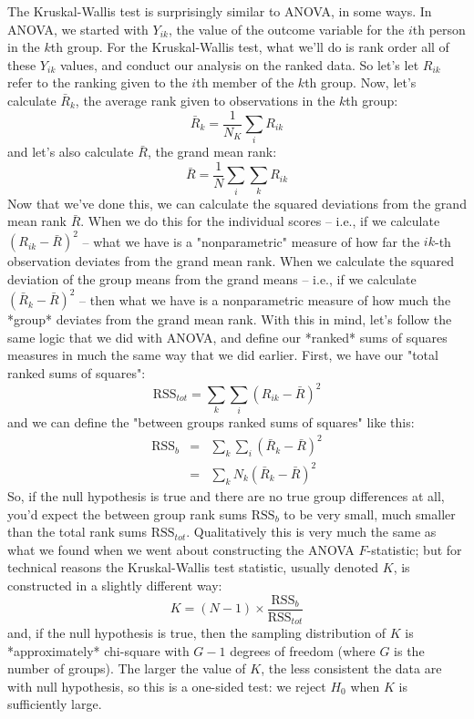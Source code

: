 The Kruskal-Wallis test is surprisingly similar to ANOVA, in some ways. In ANOVA, we started with $Y_{ik}$, the value of the outcome variable for the $i$th person in the $k$th group. For the Kruskal-Wallis test, what we'll do is rank order all of these $Y_{ik}$ values, and conduct our analysis on the ranked data. So let's let $R_{ik}$ refer to the ranking given to the $i$th member of the $k$th group. Now, let's calculate $\bar{R}_k$, the average rank given to observations in the $k$th group:
$$
\bar{R}_k = \frac{1}{N_K} \sum_{i} R_{ik}
$$
and let's also calculate $\bar{R}$, the grand mean rank:
$$
\bar{R} = \frac{1}{N} \sum_{i} \sum_{k} R_{ik}
$$
Now that we've done this, we can calculate the squared deviations from the grand mean rank $\bar{R}$. When we do this for the individual scores -- i.e., if we calculate $(R_{ik} - \bar{R})^2$ -- what we have is a "nonparametric" measure of how far the $ik$-th observation deviates from the grand mean rank. When we calculate the squared deviation of the group means from the grand means -- i.e., if we calculate $(\bar{R}_k  - \bar{R} )^2$ -- then what we have is a nonparametric measure of how much the *group* deviates from the grand mean rank. With this in mind, let's follow the same logic that we did with ANOVA, and define our *ranked* sums of squares measures in much the same way that we did earlier. First, we have our "total ranked sums of squares":
$$
\mbox{RSS}_{tot} = \sum_k \sum_i ( R_{ik} - \bar{R} )^2
$$
and we can define the "between groups ranked sums of squares" like this:
$$
\begin{array}{rcl}
\mbox{RSS}_{b} &=& \sum_k \sum_i ( \bar{R}_k  - \bar{R} )^2 \\
&=& \sum_k N_k ( \bar{R}_k  - \bar{R} )^2 
\end{array}
$$
So, if the null hypothesis is true and there are no true group differences at all, you'd expect the between group rank sums $\mbox{RSS}_{b}$ to be very small, much smaller than the total rank sums $\mbox{RSS}_{tot}$. Qualitatively this is very much the same as what we found when we went about constructing the ANOVA $F$-statistic; but for technical reasons the Kruskal-Wallis test statistic, usually denoted $K$, is constructed in a slightly different way: 
$$
K = (N - 1) \times \frac{\mbox{RSS}_b}{\mbox{RSS}_{tot}}
$$
and, if the null hypothesis is true, then the sampling distribution of $K$ is *approximately* chi-square with $G-1$ degrees of freedom (where $G$ is the number of groups). The larger the value of $K$, the less consistent the data are with null hypothesis, so this is a one-sided test: we reject $H_0$ when $K$ is sufficiently large.



